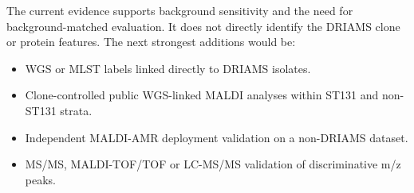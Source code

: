 \documentclass[11pt]{article}
\begin{document}
The current evidence supports background sensitivity and the need for background-matched evaluation. It does not directly identify the DRIAMS clone or protein features. The next strongest additions would be:

\begin{itemize}
  \item WGS or MLST labels linked directly to DRIAMS isolates.
  \item Clone-controlled public WGS-linked MALDI analyses within ST131 and non-ST131 strata.
  \item Independent MALDI-AMR deployment validation on a non-DRIAMS dataset.
  \item MS/MS, MALDI-TOF/TOF or LC-MS/MS validation of discriminative m/z peaks.
\end{itemize}
\end{document}

